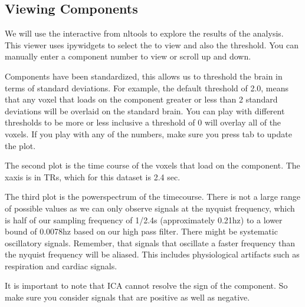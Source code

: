 \documentclass[letterpaper,10pt,english]{sphinxmanual}
\begin{document}
\begin{sphinxVerbatim}[commandchars=\\\{\}]
  
     
\end{sphinxVerbatim}


\subsection{Viewing Components}
\label{\detokenize{content/ICA:viewing-components}}
We will use the interactive  from nltools to explore the results of the analysis. This viewer uses ipywidgets to select the  to view and also the threshold. You can manually enter a component number to view or scroll up and down.

Components have been standardized, this allows us to threshold the brain in terms of standard deviations. For example, the default threshold of 2.0, means that any voxel that loads on the component greater or less than 2 standard deviations will be overlaid on the standard brain. You can play with different thresholds to be more or less inclusive \sphinxhyphen{} a threshold of 0 will overlay all of the voxels. If you play with any of the numbers, make sure you press tab to update the plot.

The second plot is the time course of the voxels that load on the component. The x\sphinxhyphen{}axis is in TRs, which for this dataset is 2.4 sec.

The third plot is the powerspectrum of the timecourse. There is not a large range of possible values as we can only observe signals at the nyquist frequency, which is half of our sampling frequency of 1/2.4s (approximately 0.21hz) to a lower bound of 0.0078hz based on our high pass filter. There might be systematic oscillatory signals. Remember, that signals that oscillate a faster frequency than the nyquist frequency will be aliased. This includes physiological artifacts such as respiration and cardiac signals.

It is important to note that ICA cannot resolve the sign of the component. So make sure you consider signals that are positive as well as negative.
\end{document}

